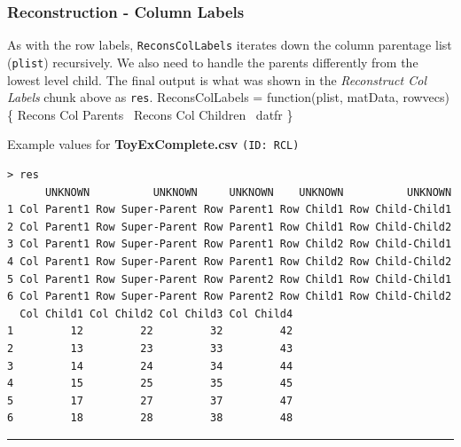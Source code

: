 \documentclass[a4paper]{article}
\begin{document}
\subsubsection{Reconstruction - Column Labels}
\label{sec:ReconsColLabels}
As with the row labels, \verb|ReconsColLabels| iterates down the
column parentage list (\verb|plist|) recursively. We also need to
handle the parents differently from the lowest level child. The final
output is what was shown in the \emph{Reconstruct Col Labels} chunk
above as \verb|res|.
\nwenddocs{}\endmoddef
ReconsColLabels =
  function(plist, matData, rowvecs)\{
    \LA{}Recons Col Parents~{\nwtagstyle{}}\RA{}
    \LA{}Recons Col Children~{\nwtagstyle{}}\RA{}
    datfr
  \}
\eatline
{}\nwendcode{}\nwdocspar

Example values for \textbf{ToyExComplete.csv} \texttt{(ID: RCL)}
\begin{verbatim}
> res
      UNKNOWN          UNKNOWN     UNKNOWN    UNKNOWN          UNKNOWN
1 Col Parent1 Row Super-Parent Row Parent1 Row Child1 Row Child-Child1
2 Col Parent1 Row Super-Parent Row Parent1 Row Child1 Row Child-Child2
3 Col Parent1 Row Super-Parent Row Parent1 Row Child2 Row Child-Child1
4 Col Parent1 Row Super-Parent Row Parent1 Row Child2 Row Child-Child2
5 Col Parent1 Row Super-Parent Row Parent2 Row Child1 Row Child-Child1
6 Col Parent1 Row Super-Parent Row Parent2 Row Child1 Row Child-Child2
  Col Child1 Col Child2 Col Child3 Col Child4
1         12         22         32         42
2         13         23         33         43
3         14         24         34         44
4         15         25         35         45
5         17         27         37         47
6         18         28         38         48
\end{verbatim}
\vspace{-1.5em}
\noindent\rule{0.25\textwidth}{0.4pt}
\vspace{0.5em}
\end{document}
